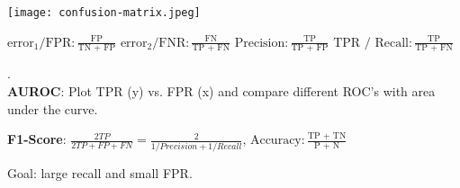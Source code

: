 \begin{multicols*}{2}
	\begin{center}
		\texttt{[image: confusion-matrix.jpeg]}
	\end{center}
	
	$\text{error}_1 / \text{FPR}: \frac{\text{FP}}{\text{TN + FP}}$
	$\text{error}_2 / \text{FNR}: \frac{\text{FN}}{\text{TP + FN}}$
	$\text{Precision}: \frac{\text{TP}}{\text{TP + FP}}$
	$\text{TPR / Recall}: \frac{\text{TP}}{\text{TP + FN}}$
\end{multicols*}

.\\[-20pt]
\textbf{AUROC}: Plot TPR (y) vs. FPR (x) and compare different ROC's with area under the curve.

\textbf{F1-Score}: $\frac{2TP}{2TP+FP+FN}=\frac{2}{1/Precision+1/Recall}$, $\text{Accuracy}: \frac{\text{TP + TN}}{\text{P + N}}$

Goal: large recall and small FPR.
